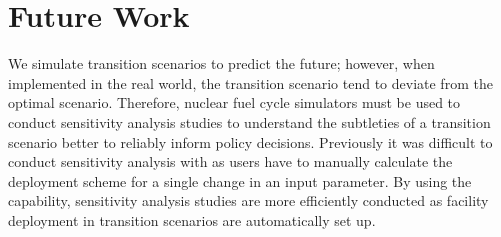 \section{Future Work}
We simulate transition scenarios to predict the future; 
however, when implemented in the real world, the transition 
scenario tend to deviate from the optimal scenario.
Therefore, nuclear fuel cycle simulators must be used to conduct
sensitivity analysis studies to understand the subtleties of 
a transition scenario better to reliably inform policy decisions.
Previously it was difficult to conduct sensitivity analysis with \Cyclus 
as users have to manually calculate the deployment scheme for a 
single change in an input parameter. 
By using the \deploy capability,
sensitivity analysis studies are more efficiently 
conducted as facility deployment in transition scenarios 
are automatically set up. 